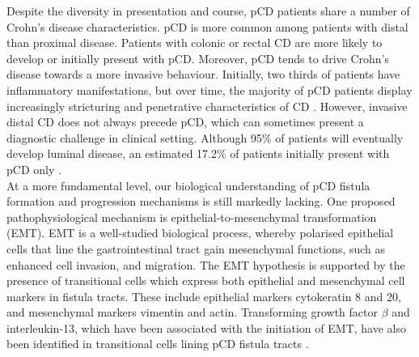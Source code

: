 
Despite the diversity in presentation and course, pCD patients share a number of Crohn's disease characteristics. pCD is  more common among patients with distal than proximal disease. Patients with colonic or rectal CD are more likely to develop or initially present with pCD. Moreover, pCD tends to drive Crohn's disease towards a more invasive behaviour. Initially, two thirds of patients have inflammatory manifestations, but over time, the majority of pCD patients display increasingly stricturing and penetrative characteristics of CD \cite{Peyrin-Biroulet2010-mf,Scharl2017-sp}. However, invasive distal CD does not always precede pCD, which can sometimes present a diagnostic challenge in clinical setting. Although 95\% of patients will eventually develop luminal disease, an estimated 17.2\% of patients initially present with pCD only \cite{Eglinton2012-hh}. \\

At a more fundamental level, our biological understanding of pCD fistula formation and progression mechanisms is still markedly lacking. One proposed pathophysiological mechanism is epithelial-to-mesenchymal transformation (EMT). EMT is a well-studied biological process, whereby polarised epithelial cells that line the gastrointestinal tract gain mesenchymal functions, such as enhanced cell invasion, and migration. The EMT hypothesis is supported by the presence of transitional cells which express both epithelial and mesenchymal cell markers in fistula tracts. These include epithelial markers cytokeratin 8 and 20, and mesenchymal markers vimentin and actin. Transforming growth factor $\beta$ and interleukin-13, which have been associated with the initiation of EMT, have also been identified in transitional cells lining pCD fistula tracts \cite{Scharl2013-uf}. \\

